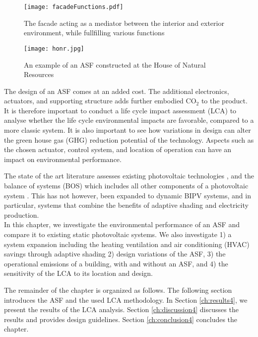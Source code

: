 \begin{figure}
\begin{center}
\texttt{[image: facadeFunctions.pdf]}
\caption{The facade acting as a mediator between the interior and exterior environment, while fullfilling various functions \cite{nagy2016adaptive}}
\label{fig:ASFschematic4}
\end{center}
\end{figure}

\begin{figure}
\begin{center}
\texttt{[image: honr.jpg]}
\caption{An example of an ASF constructed at the House of Natural Resources \cite{nagy2016adaptive}}
\label{fig:HoNR4}
\end{center}
\end{figure}

The design of an ASF comes at an added cost. The additional electronics, actuators, and supporting structure adds further embodied CO$_2$ to the product. It is therefore important to conduct a life cycle impact assessment (LCA) to analyse whether the life cycle environmental impacts are favorable, compared to a more classic system. It is also important to see how variations in design can alter the green house gas (GHG) reduction potential of the technology. Aspects such as the chosen actuator, control system, and location of operation can have an impact on environmental performance. 

The state of the art literature assesses existing photovoltaic technologies \cite{raugei2007life, de2013energy, fthenakis2011photovoltaics}, and the balance of systems (BOS) which includes all other components of a photovoltaic system \cite{mason2006energy}. This has not however, been expanded to dynamic BIPV systems, and in particular, systems that combine the benefits of adaptive shading and electricity production.\\


In this chapter, we investigate the environmental performance of an ASF and compare it to existing static photovoltaic systems. We also investigate 1) a system expansion including the heating ventilation and air conditioning (HVAC) savings through adaptive shading 2) design variations of the ASF, 3) the operational emissions of a building, with and without an ASF, and 4) the sensitivity of the LCA to its location and design.



The remainder of the chapter is organized as follows. The following section introduces the ASF and the used LCA methodology. In Section \ref{ch:results4}, we present the results of the LCA analysis. Section \ref{ch:discussion4} discusses the results and provides design guidelines. Section \ref{ch:conclusion4} concludes the chapter.

